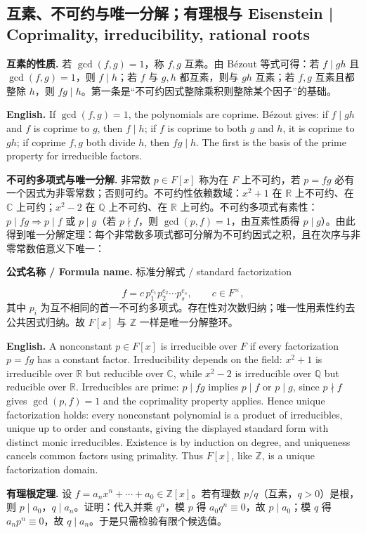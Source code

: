 \documentclass[UTF8,11pt,a4paper]{ctexart}
\newcommand{\EN}[1]{\par\noindent\textbf{English.} #1\par}
\newcommand{\FORMULA}[2]{\par\noindent\textbf{公式名称 / Formula name.} #1 / #2\par}
\begin{document}
\subsection{互素、不可约与唯一分解；有理根与 Eisenstein | Coprimality, irreducibility, rational roots}
\noindent\textbf{互素的性质.} 若 $\gcd(f,g)=1$，称 $f,g$ 互素。由 Bézout 等式可得：若 $f\mid gh$ 且 $\gcd(f,g)=1$，则 $f\mid h$；若 $f$ 与 $g,h$ 都互素，则与 $gh$ 互素；若 $f,g$ 互素且都整除 $h$，则 $fg\mid h$。第一条是“不可约因式整除乘积则整除某个因子”的基础。
\EN{If $\gcd(f,g)=1$, the polynomials are coprime. Bézout gives: if $f\mid gh$ and $f$ is coprime to $g$, then $f\mid h$; if $f$ is coprime to both $g$ and $h$, it is coprime to $gh$; if coprime $f,g$ both divide $h$, then $fg\mid h$. The first is the basis of the prime property for irreducible factors.}
\noindent\textbf{不可约多项式与唯一分解.} 非常数 $p\in F[x]$ 称为在 $F$ 上不可约，若 $p=fg$ 必有一个因式为非零常数；否则可约。不可约性依赖数域：$x^2+1$ 在 $\mathbb R$ 上不可约、在 $\mathbb C$ 上可约；$x^2-2$ 在 $\mathbb Q$ 上不可约、在 $\mathbb R$ 上可约。不可约多项式有素性：$p\mid fg\Rightarrow p\mid f$ 或 $p\mid g$（若 $p\nmid f$，则 $\gcd(p,f)=1$，由互素性质得 $p\mid g$）。由此得到唯一分解定理：每个非常数多项式都可分解为不可约因式之积，且在次序与非零常数倍意义下唯一：
\FORMULA{标准分解式}{standard factorization}
\[
f=c\,p_1^{e_1}p_2^{e_2}\cdots p_s^{e_s},\qquad c\in F^\times,
\]
其中 $p_i$ 为互不相同的首一不可约多项式。存在性对次数归纳；唯一性用素性约去公共因式归纳。故 $F[x]$ 与 $\mathbb Z$ 一样是唯一分解整环。
\EN{A nonconstant $p\in F[x]$ is irreducible over $F$ if every factorization $p=fg$ has a constant factor. Irreducibility depends on the field: $x^2+1$ is irreducible over $\mathbb R$ but reducible over $\mathbb C$, while $x^2-2$ is irreducible over $\mathbb Q$ but reducible over $\mathbb R$. Irreducibles are prime: $p\mid fg$ implies $p\mid f$ or $p\mid g$, since $p\nmid f$ gives $\gcd(p,f)=1$ and the coprimality property applies. Hence unique factorization holds: every nonconstant polynomial is a product of irreducibles, unique up to order and constants, giving the displayed standard form with distinct monic irreducibles. Existence is by induction on degree, and uniqueness cancels common factors using primality. Thus $F[x]$, like $\mathbb Z$, is a unique factorization domain.}
\noindent\textbf{有理根定理.} 设 $f=a_nx^n+\cdots+a_0\in\mathbb Z[x]$。若有理数 $p/q$（互素，$q>0$）是根，则 $p\mid a_0$，$q\mid a_n$。证明：代入并乘 $q^n$，模 $p$ 得 $a_0q^n\equiv0$，故 $p\mid a_0$；模 $q$ 得 $a_np^n\equiv0$，故 $q\mid a_n$。于是只需检验有限个候选值。
\end{document}
